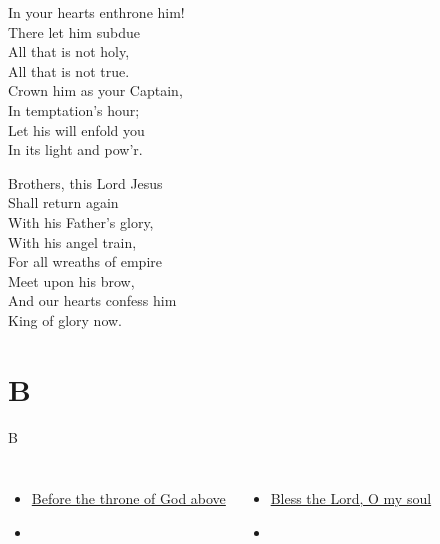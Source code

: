 \documentclass[aspectratio=169]{beamer}
\begin{document}
{\begin{frame}{}
\end{frame}
\hypertarget{At the name of Jesus[]3}{}
\begin{frame}{}
\fontsize{18.75}{22.5}\selectfont

In your hearts enthrone him!\\ 
There let him subdue\\ 
All that is not holy,\\ 
All that is not true.\\ 
Crown him as your Captain,\\ 
In temptation's hour;\\ 
Let his will enfold you\\ 
In its light and pow'r.

\end{frame}
\hypertarget{At the name of Jesus[]4}{}
\begin{frame}{}
\fontsize{18.75}{22.5}\selectfont

Brothers, this Lord Jesus\\ 
Shall return again\\ 
With his Father's glory,\\ 
With his angel train,\\ 
For all wreaths of empire\\ 
Meet upon his brow,\\ 
And our hearts confess him\\ 
King of glory now.

\end{frame}
}

\section{ B }

\begin{frame}[t]{B}
\begin{columns}[t]
\begin{itemize}
    \item \hyperlink{Before the throne of God above[]}{Before the throne of God above}
    \item[] \phantom{1}
\end{itemize}
\begin{itemize}
    \item \hyperlink{10,000 reasons['Bless the Lord, O my soul']}{Bless the Lord, O my soul}
    \item[] \phantom{1}
\end{itemize}
\end{columns}
\end{frame}
\end{document}
